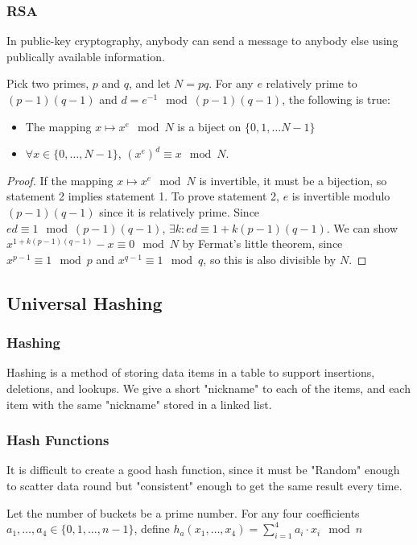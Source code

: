 \subsubsection{RSA}
  In public-key cryptography, anybody can send a message to anybody else using publically available information.

\begin{thm}
  Pick two primes, $p$ and $q$, and let $N = pq$. 
  For any $e$ relatively prime to $(p-1)(q-1)$ and $d = e^{-1} \mod (p - 1)(q - 1)$, the following is true:
  \begin{itemize}
    \item The mapping $x \mapsto x^e \mod N$ is a biject on $\{0, 1, \dots N-1 \}$
    \item $\forall x \in \{0, \dots, N-1\}$, $(x^e)^d \equiv x \mod N$.
  \end{itemize}
\end{thm}
\begin{proof}
  If the mapping $x \mapsto x^e \mod N$ is invertible, it must be a bijection, so statement 2 implies statement 1.
  To prove statement 2, $e$ is invertible modulo $(p-1)(q-1)$ since it is relatively prime.
  Since $ed \equiv 1 \mod (p-1)(q-1)$, $\exists k: ed \equiv 1 + k(p - 1)(q - 1)$.
  We can show $x^{1 + k(p-1)(q-1)} - x \equiv 0 \mod N$ by Fermat's little theorem, since $x^{p-1} \equiv 1 \mod p$ and $x^{q-1} \equiv 1 \mod q$, so this is also divisible by $N$.
\end{proof}

\subsection{Universal Hashing}
\subsubsection{Hashing}
Hashing is a method of storing data items in a table to support insertions, deletions, and lookups.
We give a short "nickname" to each of the items, and each item with the same "nickname" stored in a linked list.

\subsubsection{Hash Functions}
It is difficult to create a good hash function, since it must be "Random" enough to scatter data round but "consistent" enough to get the same result every time.
\begin{definition}
Let the number of buckets be a prime number.
For any four coefficients $a_1, \dots, a_4 \in \{0, 1, \dots, n-1\}$, define $h_a(x_1, \dots, x_4) = \sum_{i=1}^{4} a_i \cdot x_i \mod n$
\end{definition}

